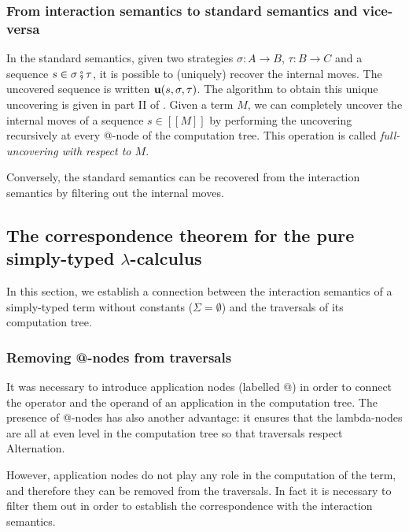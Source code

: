 \documentclass{llncs}
\newcommand{\lsem}{[\![} %
\newcommand{\rsem}{]\!]} %
\newcommand{\sem}[1]{{\lsem #1 \rsem}}
\begin{document}
\subsubsection{From interaction semantics to standard semantics and vice-versa}

In the standard semantics, given two strategies $\sigma : A \rightarrow B$, $\tau : B \rightarrow C$ and
a sequence $s \in \sigma \fatsemi \tau$, it is possible to (uniquely) recover the internal moves. The uncovered sequence is written
${\bf u}(s, \sigma, \tau)$. The algorithm to obtain this unique uncovering is given in part II of \cite{hylandong_pcf}.
Given a term $M$, we can completely uncover the internal moves of a
sequence $s\in\sem{M}$ by performing the uncovering recursively at
every @-node of the computation tree. This operation is called
\emph{full-uncovering with respect to $M$}.

Conversely, the standard semantics can be recovered from the
interaction semantics by filtering out the internal moves.


\subsection{The correspondence theorem for the pure simply-typed $\lambda$-calculus}
In this section, we establish a
connection between the interaction semantics of a simply-typed term without constants ($\Sigma = \emptyset$)
and the traversals of its computation tree.

\subsubsection{Removing @-nodes from traversals}

It was necessary to introduce application nodes (labelled @) in order to connect the operator and
the operand of an application in the computation tree. The presence of @-nodes has also
another advantage: it ensures that the lambda-nodes are all at even
level in the computation tree so that traversals respect Alternation.

However, application nodes do not play any role in the computation of the term, and therefore
they can be removed from the traversals. In fact it is
necessary to filter them out in order to establish the
correspondence with the interaction semantics.
\end{document}
